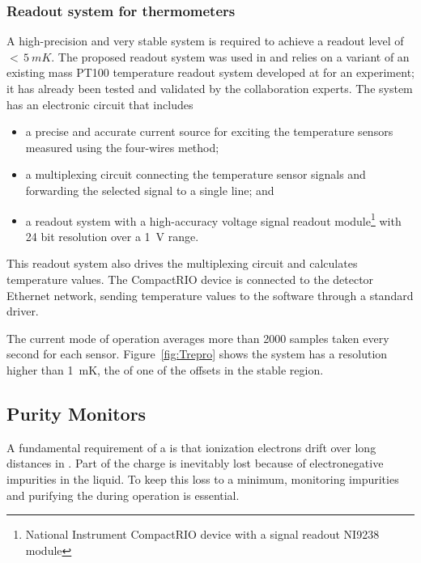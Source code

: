 \subsubsection{Readout system for thermometers}
\label{sec:fdgen-slow-cryo-therm-readout}

A %
high-precision and very stable system is required to achieve a readout level of $<\,\SI{5}{mK}$.
The proposed readout system was used in  and relies on a variant of an existing mass PT100 temperature readout system developed at
 for an  
experiment; it has already been tested and validated by the collaboration experts. The system has an electronic circuit that includes
\begin{itemize}
\item a precise and accurate current source for exciting the temperature sensors measured using the four-wires method;
\item a multiplexing circuit connecting the temperature sensor signals and forwarding the selected signal to a single line; and 
\item a readout system  with a high-accuracy voltage signal readout module\footnote{National Instrument CompactRIO\texttrademark{} device  with a signal readout NI9238\texttrademark{} module} with 24 bit resolution over a \SI{1}{V} range.
\end{itemize}
This readout system also drives the multiplexing circuit and calculates temperature values. The CompactRIO device is connected to the detector Ethernet network, sending temperature values to the  software through a standard  driver.

The current mode of operation averages more than \num{2000} samples taken every second for each sensor. 
Figure~\ref{fig:Trepro} shows the system has a resolution higher than 
\SI{1}{mK}, the  of one of the offsets in the stable region.




\subsection{Purity Monitors}
\label{sec:fdgen-slow-cryo-purity-mon}
A fundamental requirement of a   is that ionization electrons drift over long distances in . Part of the charge is inevitably lost because of electronegative impurities in the liquid. To keep this loss to a minimum, monitoring impurities and purifying the  during operation is essential.


